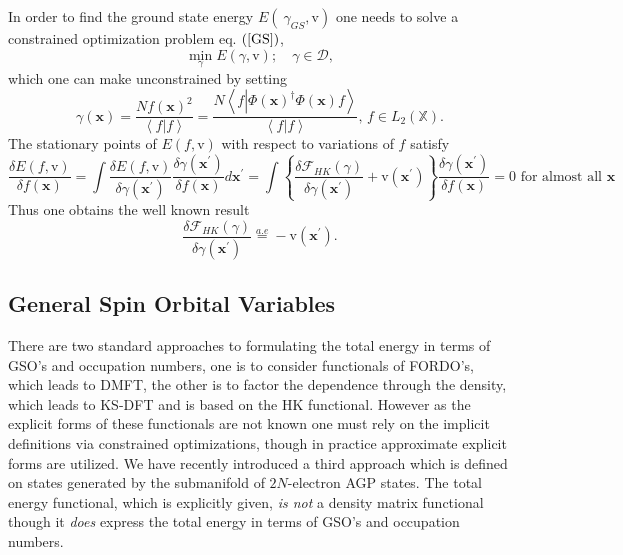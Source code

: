 \documentclass[aps,preprint]{revtex4}%
\begin{document}
In order to find the ground state energy $E\left(  \ \gamma_{GS}%
\mathbf{,}\mathrm{v}\right)  $ one needs to solve a constrained optimization
problem eq. $\left(  \ref{GS}\right)  $,
\begin{equation}
\min_{\gamma}E\left(  \gamma\mathbf{,}\mathrm{v}\right)  ;\quad\gamma
\in\mathcal{D},
\end{equation}
which one can make unconstrained by setting
\begin{equation}
\gamma\left(  \mathbf{x}\right)  =\frac{Nf\left(  \mathbf{x}\right)  ^{2}%
}{\left\langle f|f\right\rangle }=\frac{N\left\langle f\left\vert \Phi\left(
\mathbf{x}\right)  ^{\dagger}\Phi\left(  \mathbf{x}\right)  f\right.
\right\rangle }{\left\langle f|f\right\rangle },\,f\in L_{2}\left(
\mathbb{X}\right)  .
\end{equation}
The stationary points of $E\left(  f\mathbf{,}\mathrm{v}\right)  $ with
respect to variations of $f$ satisfy
\begin{equation}
\frac{\delta E\left(  f\mathbf{,}\mathrm{v}\right)  }{\delta f\left(
\mathbf{x}\right)  }=\int\frac{\delta E\left(  f\mathbf{,}\mathrm{v}\right)
}{\delta\gamma\left(  \mathbf{x}^{\prime}\right)  }\frac{\delta\gamma\left(
\mathbf{x}^{\prime}\right)  }{\delta f\left(  \mathbf{x}\right)  }%
d\mathbf{x}^{\prime}=\int\left\{  \frac{\delta\mathcal{F}_{HK}\left(
\gamma\right)  }{\delta\gamma\left(  \mathbf{x}^{\prime}\right)  }%
+\mathrm{v}\left(  \mathbf{x}^{\prime}\right)  \right\}  \frac{\delta
\gamma\left(  \mathbf{x}^{\prime}\right)  }{\delta f\left(  \mathbf{x}\right)
}=0\text{ for almost all }\mathbf{x} \label{Efderiv}%
\end{equation}
Thus one obtains the well known result
\begin{equation}
\frac{\delta\mathcal{F}_{HK}\left(  \gamma\right)  }{\delta\gamma\left(
\mathbf{x}^{\prime}\right)  }\overset{a.e}{=}-\mathrm{v}\left(  \mathbf{x}%
^{\prime}\right)  .
\end{equation}


\subsection{General Spin Orbital Variables \label{GSO}}

There are two standard approaches to formulating the total energy in terms of
GSO's and occupation numbers, one is to consider functionals of FORDO's, which
leads to DMFT, the other is to factor the dependence through the density,
which leads to KS-DFT and is based on the HK functional. However as the
explicit forms of these functionals are not known one must rely on the
implicit definitions via constrained optimizations, though in practice
approximate explicit forms are utilized. We have recently \cite{WeinerOrtiz05}
introduced a third approach which is defined on states generated by the
submanifold of $2N$-electron AGP states. The total energy functional, which is
explicitly given, \emph{is not} a density matrix functional though it
\emph{does} express the total energy in terms of GSO's and occupation numbers.
\end{document}
